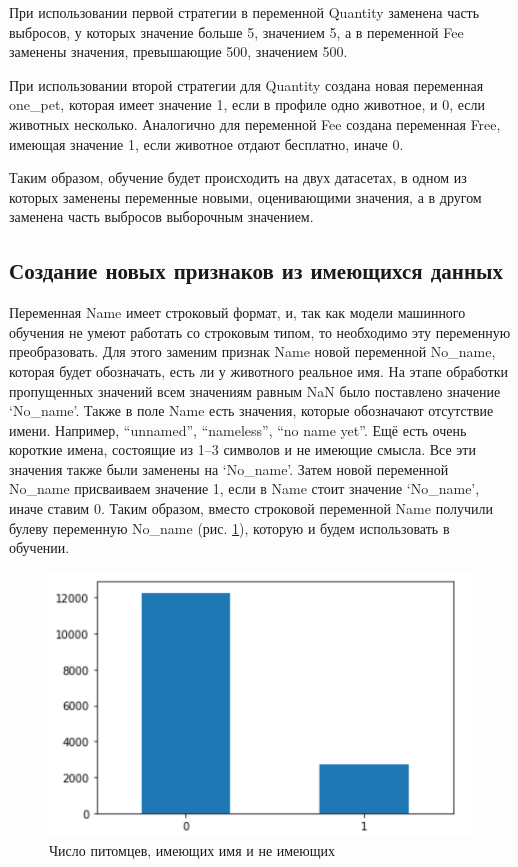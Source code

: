 \documentclass[14pt]{mmcs_article}
\begin{document}
При использовании первой стратегии в переменной Quantity заменена часть выбросов, у которых значение больше 5, значением 5, а в переменной Fee заменены значения, превышающие 500, значением 500.

При использовании второй стратегии для Quantity создана новая переменная one\_pet, которая имеет значение 1, если в профиле одно животное, и 0, если животных несколько. Аналогично для переменной Fee создана переменная Free, имеющая значение 1, если животное отдают бесплатно, иначе 0.

Таким образом, обучение будет происходить на двух датасетах, в одном из которых заменены переменные новыми, оценивающими значения, а в другом заменена часть выбросов выборочным значением.


\subsection{Создание новых признаков из имеющихся данных}

Переменная Name имеет строковый формат, и, так как модели машинного обучения не умеют работать со строковым типом, то необходимо эту переменную преобразовать. Для этого заменим признак Name новой переменной No\_name, которая будет обозначать, есть ли у животного реальное имя. На этапе обработки пропущенных значений всем значениям равным NaN было поставлено значение `No\_name'. Также в поле Name есть значения, которые обозначают отсутствие имени. Например, ``unnamed'', ``nameless'', ``no name yet''. Ещё есть очень короткие имена, состоящие из 1–3 символов и не имеющие смысла. Все эти значения также были заменены на `No\_name'. Затем новой переменной No\_name присваиваем значение 1, если в Name стоит значение `No\_name', иначе ставим 0. Таким образом, вместо строковой переменной Name получили булеву переменную No\_name (рис. \ref{analyse:hasname}), которую и будем использовать в обучении.

\begin{figure}[H]
	\centering
	\includegraphics[scale=1]{hasname.png}
	\caption{Число питомцев, имеющих имя и не имеющих}\label{analyse:hasname}
\end{figure}
\end{document}
